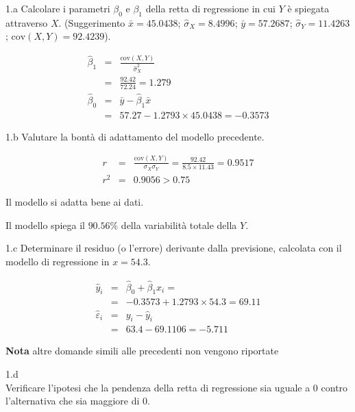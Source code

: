 \documentclass[
  11pt,
]{book}
\theoremstyle{mytheoremstyle}
\theoremstyle{mydefstyle}
\newenvironment{sol}
  {
  \begin{tcolorbox}[enhanced,breakable,arc=0.1mm,boxrule=1pt,colback=white,colframe=iblue,
  title=\bf \fontfamily{lmss}\selectfont \hspace{.5 cm} Soluzione,drop fuzzy shadow]

}{
\end{tcolorbox}
  }
\begin{document}
1.a Calcolare i parametri \(\beta_{0}\) e \(\beta_{1}\)
della retta di regressione in cui \(Y\) è spiegata attraverso \(X\).
(Suggerimento \(\bar{x} = 45.0438\); \(\hat\sigma_{X} = 8.4996\);
\(\bar{y} = 57.2687\); \(\hat\sigma_{Y} = 11.4263\); \(\text{cov}(X,Y)= 92.4239\)).

\begin{sol}
\begin{eqnarray*}
       \hat\beta_1 &=& \frac{\text{cov}(X,Y)}{\hat\sigma_X^2} \\
            &=& \frac{ 92.42 }{ 72.24 }  =  1.279 \\
      \hat\beta_0 &=& \bar y - \hat\beta_1 \bar x\\
          &=&  57.27 - 1.2793 \times  45.0438 = -0.3573 
      \end{eqnarray*}

\end{sol}

1.b Valutare la bontà di adattamento del modello precedente.

\begin{sol}
\begin{eqnarray*}
r&=&\frac{\text{cov}(X,Y)}{\sigma_X\sigma_Y}=\frac{ 92.42 }{ 8.5 \times 11.43 }= 0.9517 \\ 
r^2&=& 0.9056 > 0.75
\end{eqnarray*}

Il modello si adatta bene ai dati.

Il modello spiega il \(90.56\%\) della variabilità totale della \(Y\).

\end{sol}

1.c Determinare il residuo (o l'errore) derivante
dalla previsione, calcolata con il modello di regressione in \(x=54.3\).

\begin{sol}
\begin{eqnarray*}
\hat y_i &=&\hat\beta_0+\hat\beta_1 x_i=\\ 
&=& -0.3573 + 1.2793 \times 54.3 = 69.11 \\ 
\hat \varepsilon_i &=& y_i-\hat y_i\\ 
&=& 63.4 - 69.1106 = -5.711  
\end{eqnarray*}

\end{sol}

\textbf{Nota} altre domande simili alle precedenti non vengono riportate

1.d\\
Verificare
l'ipotesi che la pendenza della retta di regressione sia uguale a 0
contro l'alternativa che sia maggiore di 0.
\end{document}
